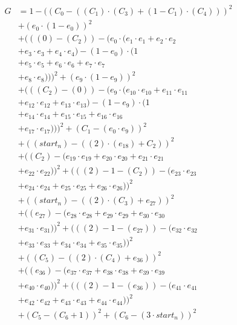 \documentclass[10pt, a4paper]{article}
\begin{document}
\begin{small}
\begin{align*}
G &= 1 - ((C_{0} - ((C_{1})  \cdot  (C_{3}) + (1 - C_{1})  \cdot  (C_{4})))^{2} \\
& + (e_{0} \cdot (1 - e_{0}))^{2} \\
& + (((0) - (C_{2})) - (e_{0} \cdot (e_{1} \cdot e_{1} + e_{2} \cdot e_{2} \\
& + e_{3} \cdot e_{3} + e_{4} \cdot e_{4}) - (1 - e_{0}) \cdot (1 \\
& + e_{5} \cdot e_{5} + e_{6} \cdot e_{6} + e_{7} \cdot e_{7} \\
& + e_{8} \cdot e_{8})))^{2} + (e_{9} \cdot (1 - e_{9}))^{2} \\
& + (((C_{2}) - (0)) - (e_{9} \cdot (e_{10} \cdot e_{10} + e_{11} \cdot e_{11} \\
& + e_{12} \cdot e_{12} + e_{13} \cdot e_{13}) - (1 - e_{9}) \cdot (1 \\
& + e_{14} \cdot e_{14} + e_{15} \cdot e_{15} + e_{16} \cdot e_{16} \\
& + e_{17} \cdot e_{17})))^{2} + (C_{1} - (e_{0} \cdot e_{9}))^{2} \\
& + ((start_n) - ((2)  \cdot  (e_{18}) + C_{2}))^{2} \\
& + ((C_{2}) - (e_{19} \cdot e_{19} + e_{20} \cdot e_{20} + e_{21} \cdot e_{21} \\
& + e_{22} \cdot e_{22}))^{2} + (((2) - 1 - (C_{2})) - (e_{23} \cdot e_{23} \\
& + e_{24} \cdot e_{24} + e_{25} \cdot e_{25} + e_{26} \cdot e_{26}))^{2} \\
& + ((start_n) - ((2)  \cdot  (C_{3}) + e_{27}))^{2} \\
& + ((e_{27}) - (e_{28} \cdot e_{28} + e_{29} \cdot e_{29} + e_{30} \cdot e_{30} \\
& + e_{31} \cdot e_{31}))^{2} + (((2) - 1 - (e_{27})) - (e_{32} \cdot e_{32} \\
& + e_{33} \cdot e_{33} + e_{34} \cdot e_{34} + e_{35} \cdot e_{35}))^{2} \\
& + ((C_{5}) - ((2)  \cdot  (C_{4}) + e_{36}))^{2} \\
& + ((e_{36}) - (e_{37} \cdot e_{37} + e_{38} \cdot e_{38} + e_{39} \cdot e_{39} \\
& + e_{40} \cdot e_{40}))^{2} + (((2) - 1 - (e_{36})) - (e_{41} \cdot e_{41} \\
& + e_{42} \cdot e_{42} + e_{43} \cdot e_{43} + e_{44} \cdot e_{44}))^{2} \\
& + (C_{5} - (C_{6} + 1))^{2} + (C_{6} - (3  \cdot  start_n))^{2} \\

\end{align*}
\end{small}
\end{document}
